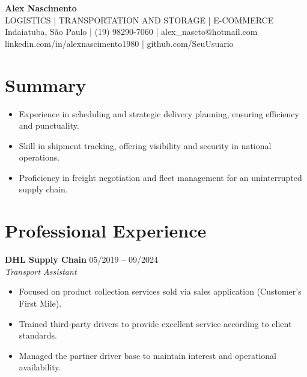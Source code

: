 \documentclass[11pt,a4paper]{article}
\begin{document}
\begin{center}
    {\Huge \textbf{ Alex Nascimento }} \\
    \vspace{2mm}
    LOGISTICS | TRANSPORTATION AND STORAGE | E-COMMERCE \\
    Indaiatuba, São Paulo | (19) 98290-7060 | alex_nascto@hotmail.com \\
    linkedin.com/in/alexnascimento1980 | github.com/SeuUsuario
\end{center}

\section*{ Summary }
\begin{itemize}
    
    
        \item Experience in scheduling and strategic delivery planning, ensuring efficiency and punctuality.
    
        \item Skill in shipment tracking, offering visibility and security in national operations.
    
        \item Proficiency in freight negotiation and fleet management for an uninterrupted supply chain.
    
\end{itemize}

\section*{ Professional Experience }

    \noindent \textbf{ DHL Supply Chain } \hfill 05/2019 -- 09/2024 \\
    \textit{ Transport Assistant }
    \begin{itemize}
        
        
            \item Focused on product collection services sold via sales application (Customer's First Mile).
        
            \item Trained third-party drivers to provide excellent service according to client standards.
        
            \item Managed the partner driver base to maintain interest and operational availability.
        
    \end{itemize}
    \vspace{2mm}
\end{document}
